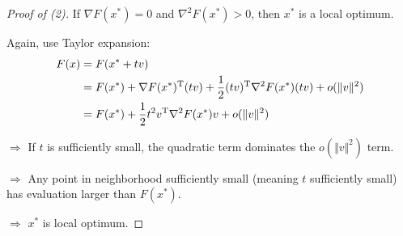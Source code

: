 \begin{proof}[Proof of (2)]
	If $\nabla F(x^*) = 0$ and $\nabla^2 F(x^*) > 0$, then $x^*$ is a local optimum.
	
	Again, use Taylor expansion: 
	\begin{align*}
	F(x) &= F(x^* + tv) \\
	&= F(x^*) + \nabla F(x^*)^{{\rm T}}(tv) + \frac{1}{2}(tv)^{{\rm T}}\nabla^2F(x^*)(tv) + o(\Vert v \Vert^2)\\
	&= F(x^*) + \frac{1}{2}t^2v^{{\rm T}}\nabla^2F(x^*)v + o(\Vert v \Vert^2)
	\end{align*}
	
	$\Rightarrow$ If $t$ is sufficiently small, the quadratic term dominates the $o(\Vert v \Vert^2)$ term.
	
	$\Rightarrow$ Any point in neighborhood sufficiently small (meaning $t$ sufficiently small) has evaluation larger than $F(x^*)$.
	
	$\Rightarrow$ $x^*$ is local optimum. 
\end{proof}

